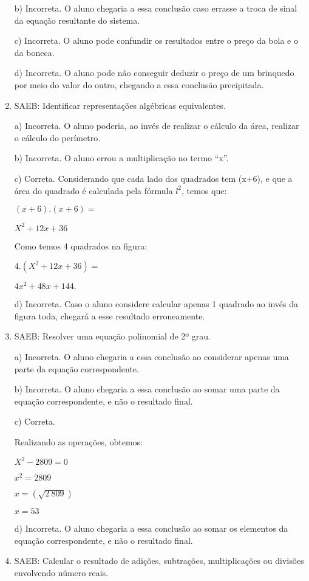 \begin{enumerate}
b) Incorreta. O aluno chegaria a essa conclusão caso errasse a
troca de sinal da equação resultante do sistema.

c) Incorreta. O aluno pode confundir os resultados entre o preço da
bola e o da boneca.

d) Incorreta. O aluno pode não conseguir deduzir o preço de um
brinquedo por meio do valor do outro, chegando a essa conclusão
precipitada.

\item SAEB: Identificar representações algébricas equivalentes.

a) Incorreta. O aluno poderia, ao invés de realizar o cálculo da
área, realizar o cálculo do perímetro.

b) Incorreta. O aluno errou a multiplicação no termo ``x''.

c) Correta. Considerando que cada lado dos quadrados tem (x+6), e
que a área do quadrado é calculada pela fórmula $l^2$, temos que:

$(x+6) . (x+6) =$

$X^2 + 12x + 36$

Como temos 4 quadrados na figura:

$4 . (X^2 + 12x+ 36) =$

$4x^2 + 48x + 144.$

d) Incorreta. Caso o aluno considere calcular apenas 1 quadrado ao
invés da figura toda, chegará a esse resultado erroneamente.

\item SAEB: Resolver uma equação polinomial de 2º grau.

a) Incorreta. O aluno chegaria a essa conclusão ao considerar
apenas uma parte da equação correspondente.

b) Incorreta. O aluno chegaria a essa conclusão ao somar uma parte
da equação correspondente, e não o resultado final.

c) Correta. 

Realizando as operações, obtemos:

$X^2 - 2 809 = 0$

$x^2 = 2 809$

$x = (\sqrt{2\ 809})$

$x = 53$

d) Incorreta. O aluno chegaria a essa conclusão ao somar os
elementos da equação correspondente, e não o resultado final.
\item SAEB: Calcular o resultado de adições, subtrações, multiplicações ou
divisões envolvendo número reais.


\end{enumerate}
